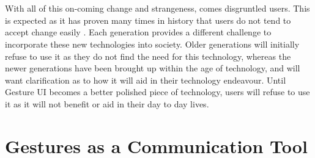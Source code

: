 \documentclass{article}
\begin{document}
\\\\
With all of this on-coming change and strangeness, comes disgruntled users. This is expected as it has proven many times in history that users do not tend to accept change easily \cite{russell1995stages}. Each generation provides a different challenge to incorporate these new technologies into society. Older generations \cite{oblinger2003boomers} will initially refuse to use it as they do not find the need for this technology, whereas the newer generations \cite{strauss1991generation} have been brought up within the age of technology, and will want clarification as to how it will aid in their technology endeavour. Until Gesture UI becomes a better polished piece of technology, users will refuse to use it as it will not benefit or aid in their day to day lives.



\section{Gestures as a Communication Tool}
\end{document}
